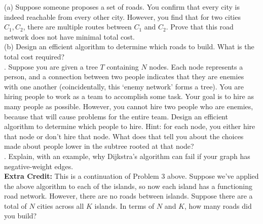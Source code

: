\documentclass[12pt]{article}
\begin{document}
\noindent
(a) Suppose someone proposes a set of roads.  You confirm that every city is indeed reachable from every other city.  However, you find that for two cities $C_1, C_2$, there are multiple routes between $C_1$ and $C_2$.  Prove that this road network does not have minimal total cost. \\

\noindent
(b) Design an efficient algorithm to determine which roads to build.  What is the total cost required?\\


.  Suppose you are given a tree $T$ containing $N$ nodes.  Each node represents a person, and a connection between two people indicates that they are enemies with one another (coincidentally, this `enemy network' forms a tree).  You are hiring people to work as a team to accomplish some task.  Your goal is to hire as many people as possible.  However, you cannot hire two people who are enemies, because that will cause problems for the entire team.  Design an efficient algorithm to determine which people to hire.  Hint: for each node, you either hire that node or don't hire that node.  What does that tell you about the choices made about people lower in the subtree rooted at that node?\\

. Explain, with an example, why Dijkstra's algorithm can fail if your graph has negative-weight edges.\\

\noindent
\textbf{Extra Credit:}  This is a continuation of Problem 3 above.  Suppose we've applied the above algorithm to each of the islands, so now each island has a functioning road network.  However, there are no roads between islands.  Suppose there are a total of $N$ cities across all $K$ islands.  In terms of $N$ and $K$, how many roads did you build?\\



 
\end{document}

